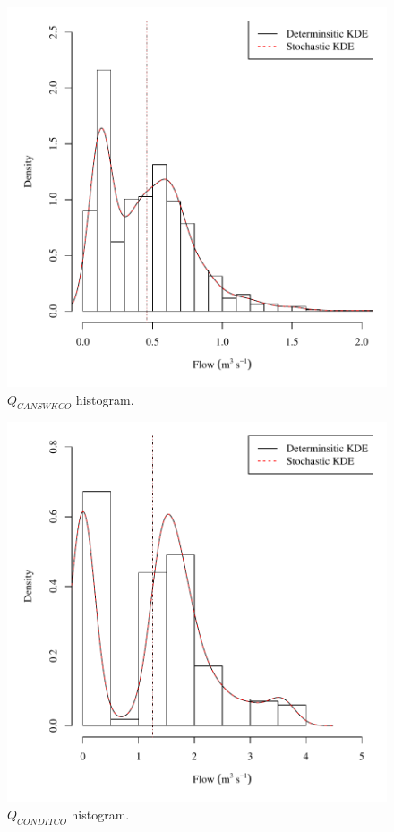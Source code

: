 \begin{center}
\begin{figure}[htbp]
	\includegraphics[width=6in]{"Figures/Results_USR/V density qCAN"}
	\caption{$Q_{CANSWKCO}$ histogram.}
\end{figure}
\end{center}
\newpage

\begin{center}
\begin{figure}[htbp]
	\includegraphics[width=6in]{"Figures/Results_USR/V density qCON"}
	\caption{$Q_{CONDITCO}$ histogram.}
\end{figure}
\end{center}
\newpage

